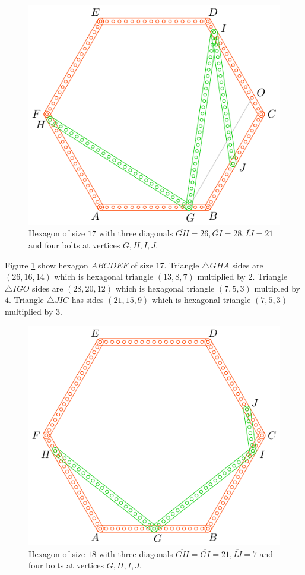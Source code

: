 \documentclass[11pt]{article}
\begin{document}
\begin{figure}[H]
\centering
\includegraphics[scale=1]{17/hexa-17a}
\caption{Hexagon of size $17$ with three diagonals $\overline{GH} = 26, \overline{GI} = 28, \overline{IJ} = 21$ and four bolts at vertices $G,H,I,J$.}
\label{fig:17a}
\end{figure}

Figure \ref{fig:17a} show hexagon $ABCDEF$ of size $17$. Triangle $\triangle{GHA}$ sides are $(26,16,14)$ which is hexagonal triangle $(13,8,7)$ multiplied by $2$. Triangle $\triangle{IGO}$ sides are $(28,20,12)$ which is hexagonal triangle $(7,5,3)$ multipled by $4$. Triangle $\triangle{JIC}$ has sides $(21,15,9)$ which is hexagonal triangle $(7,5,3)$ multiplied by $3$.

\begin{figure}[H]
\centering
\includegraphics[scale=1]{18/hexa-18a}
\caption{Hexagon of size $18$ with three diagonals $\overline{GH} = \overline{GI} = 21, \overline{IJ} = 7$ and four bolts at vertices $G,H,I,J$.}
\label{fig:18a}
\end{figure}
\end{document}
